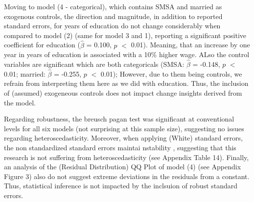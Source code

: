 \documentclass[a4paper]{article}
\begin{document}
Moving to model (4 - categorical), which contains SMSA and married as exogenous controls, the direction and magnitude, in addition to reported standard errors, for years of education do not change considerably when compared to model (2) (same for model 3 and 1), reporting a significant positive coefficient for education ($\hat{\beta}$ = 0.100, $p$ $<$ 0.01). Meaning, that an increase by one year in years of education is associated with a 10\% higher wage. ALso the control variables are significant which are both categoricals (SMSA: $\hat{\beta}$ = -0.148, $p$ $<$ 0.01; married: $\hat{\beta}$ = -0.255, $p$ $<$ 0.01); However, due to them being controls, we refrain from interpreting them here as we did with education. Thus, the inclusion of (assumed) exogeneous controls does not impact change insights derived from the model.

Regarding robustness, the breusch pagan test was significant at conventional levels for all six models (not surprising at this sample size), suggesting no issues regarding heteroscedasticity. Moreover, when applying (White) standard errors, the non standardized standard errors maintai nstability , suggesting that this research is not suffering from heteroscedasticity (see Appendix Table 14). Finally, an analysis of the (Residual Distribution) QQ Plot of model (4) (see Appendix Figure 3) also do not suggest extreme deviations in the residuals from a constant. Thus, statistical inference is not impacted by the inclsuion of robust standard errors. 
\end{document}
